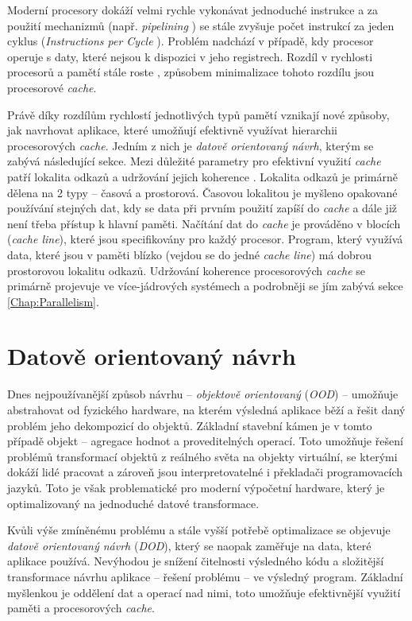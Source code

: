 Moderní procesory dokáží velmi rychle vykonávat jednoduché instrukce a za použití mechanizmů (např. \emph{pipelining} \cite{Pipelining}) se stále zvyšuje počet instrukcí za jeden cyklus (\emph{Instructions per Cycle} \cite{CpuIpc}). Problém nadchází v případě, kdy procesor operuje s daty, které nejsou k dispozici v jeho registrech. Rozdíl v rychlosti procesorů a pamětí stále roste \cite{CpuMemoryGap}, způsobem minimalizace tohoto rozdílu jsou procesorové \emph{cache}.

Právě díky rozdílům rychlostí jednotlivých typů pamětí \cite{MemoryTiming} vznikají nové způsoby, jak navrhovat aplikace, které umožňují efektivně využívat hierarchii procesorových \emph{cache}. Jedním z nich je \emph{datově orientovaný návrh}, kterým se zabývá následující sekce. Mezi důležité parametry pro efektivní využití \emph{cache} patří lokalita odkazů \cite{DataLocality} a udržování jejich koherence \cite{CacheCoherence}. Lokalita odkazů je primárně dělena na 2 typy -- časová a prostorová. Časovou lokalitou je myšleno opakované používání stejných dat, kdy se data při prvním použití zapíší do \emph{cache} a dále již není třeba přístup k hlavní paměti. Načítání dat do \emph{cache} je prováděno v blocích (\emph{cache line}), které jsou specifikovány pro každý procesor. Program, který využívá data, které jsou v paměti blízko (vejdou se do jedné \emph{cache line}) má dobrou prostorovou lokalitu odkazů. Udržování koherence procesorových \emph{cache} se primárně projevuje ve více-jádrových systémech a podrobněji se jím zabývá sekce \ref{Chap:Parallelism}.

\section{Datově orientovaný návrh}
\label{Chap:DDD}

Dnes nejpoužívanější způsob návrhu -- \emph{objektově orientovaný} (\emph{OOD}) -- umožňuje abstrahovat od fyzického hardware, na kterém výsledná aplikace běží a řešit daný problém jeho dekompozicí do objektů. Základní stavební kámen je v tomto případě objekt -- agregace hodnot a proveditelných operací. Toto umožňuje řešení problémů transformací objektů z reálného světa na objekty virtuální, se kterými dokáží lidé pracovat a zároveň jsou interpretovatelné i překladači programovacích jazyků. Toto je však problematické pro moderní výpočetní hardware, který je optimalizovaný na jednoduché datové transformace.

Kvůli výše zmíněnému problému a stále vyšší potřebě optimalizace se objevuje \emph{datově orientovaný návrh}\cite{DOD} (\emph{DOD}), který se naopak zaměřuje na data, které aplikace používá. Nevýhodou je snížení čitelnosti výsledného kódu a složitější transformace návrhu aplikace -- řešení problému -- ve výsledný program. Základní myšlenkou je oddělení dat a operací nad nimi, toto umožňuje efektivnější využití paměti a procesorových \emph{cache}.

